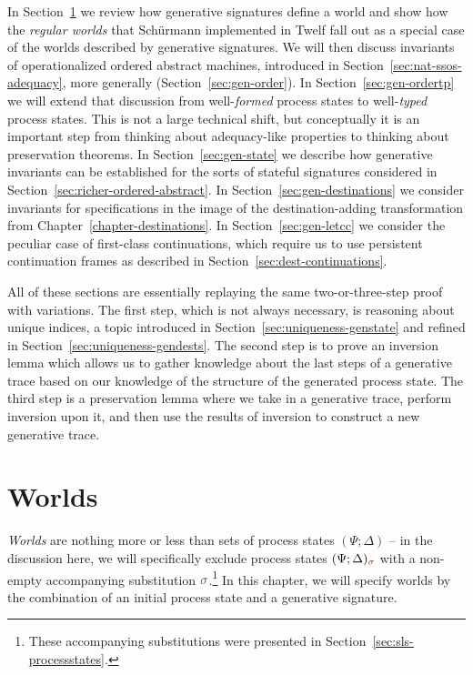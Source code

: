 In Section~\ref{sec:gen-worlds} we review how generative signatures
define a world and show how the {\it regular worlds} that Sch\"urmann
implemented in Twelf \cite{schurmann00automating} fall out as a
special case of the worlds described by generative signatures.  We
will then discuss invariants of operationalized ordered abstract
machines, introduced in Section~\ref{sec:nat-ssos-adequacy}, more
generally (Section~\ref{sec:gen-order}). In
Section~\ref{sec:gen-ordertp} we will extend that discussion from
well-{\it formed} process states to well-{\it typed} process states.
This is not a large technical shift, but conceptually it is an
important step from thinking about adequacy-like properties to
thinking about preservation theorems. 
In Section~\ref{sec:gen-state}
we describe how generative invariants can be established for the sorts
of stateful signatures considered in
Section~\ref{sec:richer-ordered-abstract}. In
Section~\ref{sec:gen-destinations} we consider invariants for
specifications in the image of the destination-adding transformation
from Chapter~\ref{chapter-destinations}.  In
Section~\ref{sec:gen-letcc} we consider the peculiar case of
first-class continuations, which require us to use persistent
continuation frames as described in Section~\ref{sec:dest-continuations}. 

All of these sections are essentially replaying the same
two-or-three-step proof with variations. The first step, which is not
always necessary, is reasoning about unique indices, a topic
introduced in Section~\ref{sec:uniqueness-genstate} and refined in
Section~\ref{sec:uniqueness-gendests}. The second step is to prove an
inversion lemma which allows us to gather knowledge about the last
steps of a generative trace based on our knowledge of the structure of
the generated process state. The third step is a preservation lemma
where we take in a generative trace, perform inversion upon it, and
then use the results of inversion to construct a new generative trace.

\section{Worlds}
\label{sec:gen-worlds}

{\it Worlds} are nothing more or less than sets of process states
$(\Psi; \Delta)$ -- in the discussion here, we will specifically
exclude process states $(\Psi; \Delta)_{\lf\sigma}$ with a non-empty
accompanying substitution $\lf\sigma$.\footnote{These accompanying
  substitutions were presented in
  Section~\ref{sec:sls-processstates}.}
In this chapter, we will specify worlds by the combination of an
initial process state and a generative signature.

